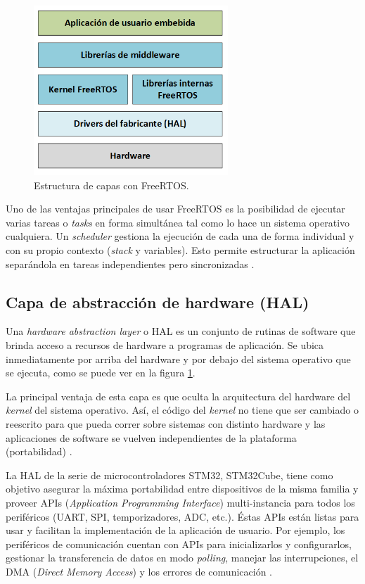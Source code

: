 \begin{figure}[H]
\centering
\includegraphics[width=0.65\textwidth]{./Figures/capas.png}
\caption{Estructura de capas con FreeRTOS.}
\label{fig:capas}
\end{figure}

Uno de las ventajas principales de usar FreeRTOS es la posibilidad de ejecutar varias tareas o \textit{tasks} en forma simultánea tal como lo hace un sistema operativo cualquiera. Un \textit{scheduler} gestiona la ejecución de cada una de forma individual y con su propio contexto (\textit{stack} y variables). Esto permite estructurar la aplicación separándola en tareas independientes pero sincronizadas \citep{WEBSITE:FREERTOS}.

\subsection{Capa de abstracción de hardware (HAL)}

Una \textit{hardware abstraction layer} o HAL es un conjunto de rutinas de software que brinda acceso a recursos de hardware a programas de aplicación. Se ubica inmediatamente por arriba del hardware y por debajo del sistema operativo que se ejecuta, como se puede ver en la figura \ref{fig:capas}.

La principal ventaja de esta capa es que oculta la arquitectura del hardware del \textit{kernel} del sistema operativo. Así, el código del \textit{kernel} no tiene que ser cambiado o reescrito para que pueda correr sobre sistemas con distinto hardware y las aplicaciones de software se vuelven independientes de la plataforma (portabilidad) \citep{WEBSITE:HAL}.

La HAL de la serie de microcontroladores STM32, STM32Cube, tiene como objetivo asegurar la máxima portabilidad entre dispositivos de la misma familia y proveer APIs (\textit{Application Programming Interface}) multi-instancia para todos los periféricos (UART, SPI, temporizadores, ADC, etc.). Éstas APIs están listas para usar y facilitan la implementación de la aplicación de usuario. Por ejemplo, los periféricos de comunicación cuentan con APIs para inicializarlos y configurarlos, gestionar la transferencia de datos en modo \textit{polling}, manejar las interrupciones, el DMA (\textit{Direct Memory Access}) y los errores de comunicación \citep{WEBSITE:STM32CUBE}.

